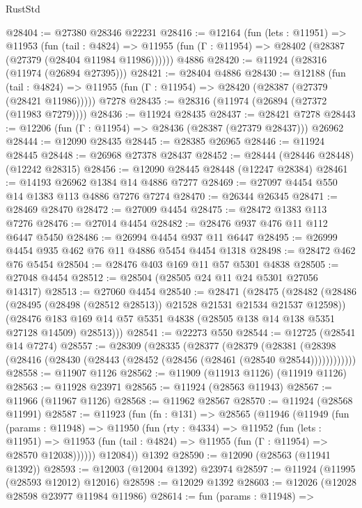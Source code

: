 \begin{lexlean}{RustStd}
\begin{coremodule}
{\begin{coremodule}
{{{{{{{{{{{{{{{{{{{{{{{{{{{{{{{{{{{{{{{{{{{{{{{{{{{{{{{{{{{{{{{{{{{{{{{{{{{{{{{{@28404 := @27380 @28346 @22231
@28416 := @12164
    (fun (lets : @11951) =>
    @11953
      (fun (tail : @4824) =>
      @11955 (fun (Γ : @11954) => @28402 (@28387 (@27379 (@28404 @11984 @11986))))))
    @4886
@28420 := @11924 (@28316 (@11974 (@26894 @27395)))
@28421 := @28404 @4886
@28430 := @12188
    (fun (tail : @4824) => @11955 (fun (Γ : @11954) => @28420 (@28387 (@27379 (@28421 @11986)))))
    @7278
@28435 := @28316 (@11974 (@26894 (@27372 (@11983 @7279))))
@28436 := @11924 @28435
@28437 := @28421 @7278
@28443 := @12206 (fun (Γ : @11954) => @28436 (@28387 (@27379 @28437))) @26962
@28444 := @12090 @28435
@28445 := @28385 @26965
@28446 := @11924 @28445
@28448 := @26968 @27378 @28437
@28452 := @28444 (@28446 @28448) (@12242 @28315)
@28456 := @12090 @28445 @28448 (@12247 @28384)
@28461 := @14193 @26962 @1384 @14 @4886 @7277
@28469 := @27097 @4454 @550 @14 @1383 @113 @4886 @7276 @7274
@28470 := @26344 @26345
@28471 := @28469 @28470
@28472 := @27009 @4454
@28475 := @28472 @1383 @113 @7276
@28476 := @27014 @4454
@28482 := @28476 @937 @476 @11 @112 @6447 @5450
@28486 := @26994 @4454 @937 @11 @6447
@28495 := @26999 @4454 @935 @462 @76 @11 @4886 @5454 @4454 @1318
@28498 := @28472 @462 @76 @5454
@28504 := @28476 @403 @169 @11 @57 @5301 @4838
@28505 := @27048 @4454
@28512 := @28504 (@28505 @24 @11 @24 @5301 @27056 @14317)
@28513 := @27060 @4454
@28540 := @28471
    (@28475
      (@28482
        (@28486 (@28495 (@28498 (@28512 @28513)) @21528 @21531 @21534 @21537 @12598))
        (@28476 @183 @169 @14 @57 @5351 @4838 (@28505 @138 @14 @138 @5351 @27128 @14509) @28513)))
@28541 := @22273 @550
@28544 := @12725 (@28541 @14 @7274)
@28557 := @28309
    (@28335
      (@28377
        (@28379
          (@28381 (@28398 (@28416 (@28430 (@28443 (@28452 (@28456 (@28461 (@28540 @28544))))))))))))
@28558 := @11907 @1126
@28562 := @11909 (@11913 @1126) (@11919 @1126)
@28563 := @11928 @23971
@28565 := @11924 (@28563 @11943)
@28567 := @11966 (@11967 @1126)
@28568 := @11962 @28567
@28570 := @11924 (@28568 @11991)
@28587 := @11923
    (fun (fn : @131) =>
    @28565
      (@11946
        (@11949
          (fun (params : @11948) =>
          @11950
            (fun (rty : @4334) =>
            @11952
              (fun (lets : @11951) =>
              @11953 (fun (tail : @4824) => @11955 (fun (Γ : @11954) => @28570 @12038))))))
        @12084))
    @1392
@28590 := @12090 (@28563 (@11941 @1392))
@28593 := @12003 (@12004 @1392) @23974
@28597 := @11924 (@11995 (@28593 @12012) @12016)
@28598 := @12029 @1392
@28603 := @12026 (@12028 @28598 @23977 @11984 @11986)
@28614 := fun (params : @11948) =>
}}}}}}}}}}}}}}}}}}}}}}}}}}}}}}}}}}}}}}}}}}}}}}}}}}}}}}}}}}}}}}}}}}}}}}}}}}}}}}}}
\end{coremodule}}
\end{coremodule}
\end{lexlean}
